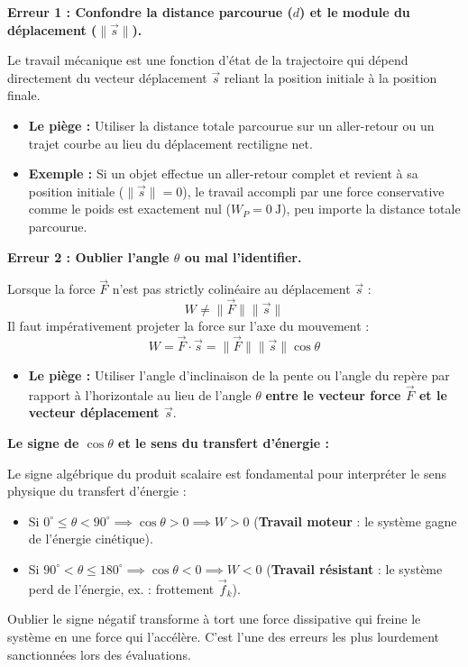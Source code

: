 \documentclass[11pt,openany]{book}
\begin{document}
\begin{erreur}
\textbf{Erreur 1 : Confondre la distance parcourue ($d$) et le module du déplacement ($\|\vec{s}\|$).}

Le travail mécanique est une fonction d'état de la trajectoire qui dépend directement du vecteur déplacement $\vec{s}$ reliant la position initiale à la position finale.
\begin{itemize}
    \item \textbf{Le piège :} Utiliser la distance totale parcourue sur un aller-retour ou un trajet courbe au lieu du déplacement rectiligne net.
    \item \textbf{Exemple :} Si un objet effectue un aller-retour complet et revient à sa position initiale ($\|\vec{s}\| = 0$), le travail accompli par une force conservative comme le poids est exactement nul ($W_P = 0\ \mathrm{J}$), peu importe la distance totale parcourue.
\end{itemize}
\end{erreur}

\begin{erreur}
\textbf{Erreur 2 : Oublier l'angle $\theta$ ou mal l'identifier.}

Lorsque la force $\vec{F}$ n'est pas strictly colinéaire au déplacement $\vec{s}$ :
\[
W \neq \|\vec{F}\| \|\vec{s}\|
\]
Il faut impérativement projeter la force sur l'axe du mouvement :
\[
W = \vec{F} \cdot \vec{s} = \|\vec{F}\| \|\vec{s}\| \cos\theta
\]
\begin{itemize}
    \item \textbf{Le piège :} Utiliser l'angle d'inclinaison de la pente ou l'angle du repère par rapport à l'horizontale au lieu de l'angle $\theta$ \textbf{entre le vecteur force $\vec{F}$ et le vecteur déplacement $\vec{s}$}.
\end{itemize}
\end{erreur}

\begin{danger}
\textbf{Le signe de $\cos\theta$ et le sens du transfert d'énergie :}

Le signe algébrique du produit scalaire est fondamental pour interpréter le sens physique du transfert d'énergie :
\begin{itemize}
    \item Si $0^\circ \le \theta < 90^\circ \implies \cos\theta > 0 \implies W > 0$ (\textbf{Travail moteur} : le système gagne de l'énergie cinétique).
    \item Si $90^\circ < \theta \le 180^\circ \implies \cos\theta < 0 \implies W < 0$ (\textbf{Travail résistant} : le système perd de l'énergie, ex. : frottement $\vec{f}_k$).
\end{itemize}
Oublier le signe négatif transforme à tort une force dissipative qui freine le système en une force qui l'accélère. C'est l'une des erreurs les plus lourdement sanctionnées lors des évaluations.
\end{danger}
\end{document}
